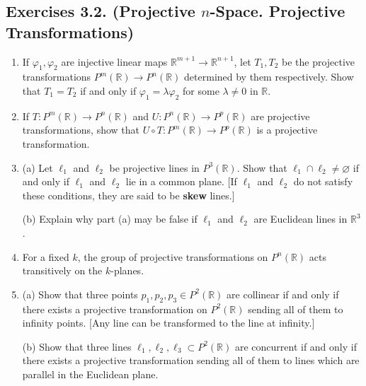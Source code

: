 \documentclass[leqno]{book}
\begin{document}
\subsection*{Exercises 3.2. (Projective $n$-Space.  Projective Transformations)} %
\begin{enumerate}
\item If $\varphi_1,\varphi_2$ are injective linear maps $\mathbb R^{m+1}\to\mathbb R^{n+1}$, let $T_1,T_2$ be the projective transformations $P^m(\mathbb R)\to P^n(\mathbb R)$ determined by them respectively.  Show that $T_1=T_2$ if and only if $\varphi_1=\lambda\varphi_2$ for some $\lambda\ne 0$ in $\mathbb R$.

\item If $T:P^m(\mathbb R)\to P^n(\mathbb R)$ and $U:P^n(\mathbb R)\to P^p(\mathbb R)$ are projective transformations, show that $U\circ T:P^m(\mathbb R)\to P^p(\mathbb R)$ is a projective transformation.

\item (a) Let $\ell_1$ and $\ell_2$ be projective lines in $P^3(\mathbb R)$.  Show that $\ell_1\cap\ell_2\ne\varnothing$ if and only if $\ell_1$ and $\ell_2$ lie in a common plane.  [If $\ell_1$ and $\ell_2$ do not satisfy these conditions, they are said to be \textbf{skew} lines.]

(b) Explain why part (a) may be false if $\ell_1$ and $\ell_2$ are Euclidean lines in $\mathbb R^3$.

\item For a fixed $k$, the group of projective transformations on $P^n(\mathbb R)$ acts transitively on the $k$-planes.

\item (a) Show that three points $p_1,p_2,p_3\in P^2(\mathbb R)$ are collinear if and only if there exists a projective transformation on $P^2(\mathbb R)$ sending all of them to infinity points.  [Any line can be transformed to the line at infinity.]

(b) Show that three lines $\ell_1,\ell_2,\ell_3\subset P^2(\mathbb R)$ are concurrent if and only if there exists a projective transformation sending all of them to lines which are parallel in the Euclidean plane.


\end{enumerate}
\end{document}
